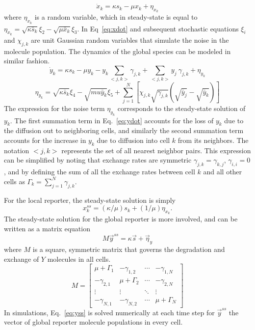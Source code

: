 \documentclass[phys,prelim]{puthesis}
\begin{document}
\begin{equation} \label{eq:xdot}
    \dot{x}_k = \kappa s_k - \mu x_k + \eta_{x_k}
\end{equation}
where $\eta_{x_k}$ is a random variable, which in steady-state is equal to
$\eta_{x_k} = \sqrt{\kappa\bar{s}_k}\xi_2 - \sqrt{\mu \bar{x}_k} \xi_3$.
In Eq\ \ref{eq:xdot} and subsequent stochastic equations $\xi_i$ and $\chi_{j,k}$ are unit Gaussian random variables that simulate the noise in the molecule population. The dynamics of the global species can be modeled in similar fashion.
\begin{equation} \label{eq:ydot}
    \dot{y}_k = \kappa s_k - \mu y_k - y_k \sum_{<j,k>} \gamma_{j,k} + \sum_{<j,k>} y_j \ \gamma_{j,k} + \eta_{y_k}
\end{equation}
\begin{equation*}
    \eta_{y_k} = \sqrt{\kappa \bar{s}_k} \xi_4 - \sqrt{mu\bar{y}_k} \xi_5 + \sum_{j=1}^N \left[ \chi_{j,k} \sqrt{\gamma_{j,k}} \left( \sqrt{\bar{y}_j}-\sqrt{\bar{y}_k} \right) \right]
\end{equation*}
The expression for the noise term $\eta_{y_k}$ corresponds to the steady-state solution of $y_k$. The first summation term in Eq.\ \ref{eq:ydot} accounts for the loss of $y_k$ due to the diffusion out to neighboring cells, and similarly the second summation term accounts for the increase in $y_k$ due to diffusion into cell $k$ from its neighbors. The notation $<j,k>$ represents the set of all nearest neighbor pairs. This expression can be simplified by noting that exchange rates are symmetric $\gamma_{j,k}=\gamma_{k,j}$, $\gamma_{i,i}=0$, and by defining the sum of all the exchange rates between cell $k$ and all other cells as $\Gamma_k = \sum_{j=1}^N \gamma_{j,k}$.

For the local reporter, the steady-state solution is simply
\begin{equation} \label{eq:xss}
    x_{k}^{ss} = \left( \kappa/\mu \right) s_k + \left( 1/\mu \right) \eta_{x_k}.
\end{equation}
The steady-state solution for the global reporter is more involved, and can be written as a matrix equation
\begin{equation} \label{eq:yss}
    M\vec{y}^{ss} = \kappa\vec{s} + \vec{\eta}_y
\end{equation}
where $M$ is a square, symmetric matrix that governs the degradation and exchange of $Y$ molecules in all cells.
\begin{equation} \label{eq:Mmatrix}
    M =
    \begin{bmatrix}
     \mu+\Gamma_1 & -\gamma_{1,2} & \cdots & -\gamma_{1,N} \\
     -\gamma_{2,1} & \mu+\Gamma_2 & \cdots & -\gamma_{2,N} \\
     \vdots  & \vdots  & \ddots & \vdots  \\
     -\gamma_{N,1} & -\gamma_{N,2} & \cdots & \mu+\Gamma_N
    \end{bmatrix}
\end{equation}
In simulations, Eq.\ \ref{eq:yss} is solved numerically at each time step for $\vec{y}^{ss}$ the vector of global reporter molecule populations in every cell.
\end{document}
